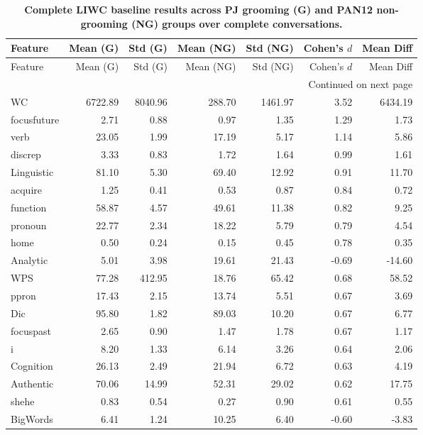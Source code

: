 
\begingroup
\scriptsize %
\setlength{\LTcapwidth}{\textwidth}
\setlength\LTleft{\fill}
\setlength\LTright{\fill}
\begin{longtable}{@{}p{3.4cm}rrrrrr@{}}
\caption[Complete LIWC baseline results]{\textbf{Complete LIWC baseline results across PJ grooming (G) and PAN12 non-grooming (NG) groups over complete conversations.}}\\
\toprule
Feature & Mean (G) & Std (G) & Mean (NG) & Std (NG) & Cohen's $d$ & Mean Diff \\
\midrule
\endfirsthead
\toprule
Feature & Mean (G) & Std (G) & Mean (NG) & Std (NG) & Cohen's $d$ & Mean Diff \\
\midrule
\endhead
\midrule
\multicolumn{7}{r}{{Continued on next page}} \\
\bottomrule
\endfoot
\bottomrule
\endlastfoot
WC & 6722.89 & 8040.96 & 288.70 & 1461.97 & 3.52 & 6434.19 \\
focusfuture & 2.71 & 0.88 & 0.97 & 1.35 & 1.29 & 1.73 \\
verb & 23.05 & 1.99 & 17.19 & 5.17 & 1.14 & 5.86 \\
discrep & 3.33 & 0.83 & 1.72 & 1.64 & 0.99 & 1.61 \\
Linguistic & 81.10 & 5.30 & 69.40 & 12.92 & 0.91 & 11.70 \\
acquire & 1.25 & 0.41 & 0.53 & 0.87 & 0.84 & 0.72 \\
function & 58.87 & 4.57 & 49.61 & 11.38 & 0.82 & 9.25 \\
pronoun & 22.77 & 2.34 & 18.22 & 5.79 & 0.79 & 4.54 \\
home & 0.50 & 0.24 & 0.15 & 0.45 & 0.78 & 0.35 \\
Analytic & 5.01 & 3.98 & 19.61 & 21.43 & -0.69 & -14.60 \\
WPS & 77.28 & 412.95 & 18.76 & 65.42 & 0.68 & 58.52 \\
ppron & 17.43 & 2.15 & 13.74 & 5.51 & 0.67 & 3.69 \\
Dic & 95.80 & 1.82 & 89.03 & 10.20 & 0.67 & 6.77 \\
focuspast & 2.65 & 0.90 & 1.47 & 1.78 & 0.67 & 1.17 \\
i & 8.20 & 1.33 & 6.14 & 3.26 & 0.64 & 2.06 \\
Cognition & 26.13 & 2.49 & 21.94 & 6.72 & 0.63 & 4.19 \\
Authentic & 70.06 & 14.99 & 52.31 & 29.02 & 0.62 & 17.75 \\
shehe & 0.83 & 0.54 & 0.27 & 0.90 & 0.61 & 0.55 \\
BigWords & 6.41 & 1.24 & 10.25 & 6.40 & -0.60 & -3.83 \\

\end{longtable}
